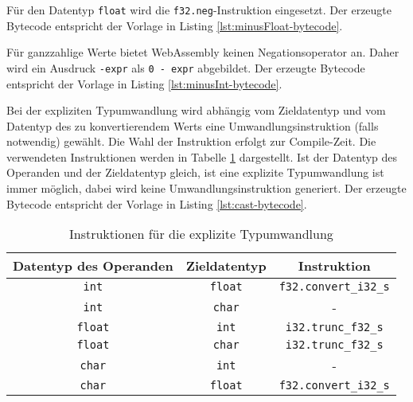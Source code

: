 Für den Datentyp \lstinline{float} wird die \lstinline{f32.neg}-Instruktion eingesetzt. Der erzeugte Bytecode entspricht der Vorlage in Listing \ref{lst:minusFloat-bytecode}.



Für ganzzahlige Werte bietet WebAssembly keinen Negationsoperator an. Daher wird ein Ausdruck \lstinline{-expr} als \lstinline{0 - expr} abgebildet. Der erzeugte Bytecode entspricht der Vorlage in Listing \ref{lst:minusInt-bytecode}.



Bei der expliziten Typumwandlung wird abhängig vom Zieldatentyp und vom Datentyp des zu konvertierendem Werts eine Umwandlungsinstruktion (falls notwendig) gewählt. Die Wahl der Instruktion erfolgt zur Compile-Zeit. Die verwendeten Instruktionen werden in Tabelle \ref{tab:castOperators} dargestellt. Ist der Datentyp des Operanden und der Zieldatentyp gleich, ist eine explizite Typumwandlung ist immer möglich, dabei wird keine Umwandlungsinstruktion generiert. Der erzeugte Bytecode entspricht der Vorlage in Listing \ref{lst:cast-bytecode}.

\begin{table}[]
    \centering
    \begin{tabular}{| c | c | c |}
        \hline
        Datentyp des Operanden & Zieldatentyp & Instruktion \\
        \hline
        {\lstinline!int!} & {\lstinline!float!} & {\lstinline!f32.convert_i32_s!} \\
        {\lstinline!int!} & {\lstinline!char!} & - \\
        {\lstinline!float!} & {\lstinline!int!} & {\lstinline!i32.trunc_f32_s!} \\
        {\lstinline!float!} & {\lstinline!char!} & {\lstinline!i32.trunc_f32_s!} \\
        {\lstinline!char!} & {\lstinline!int!} & - \\
        {\lstinline!char!} & {\lstinline!float!} & {\lstinline!f32.convert_i32_s!} \\
        \hline
    \end{tabular}
    \caption{Instruktionen für die explizite Typumwandlung}
    \label{tab:castOperators}
\end{table}

